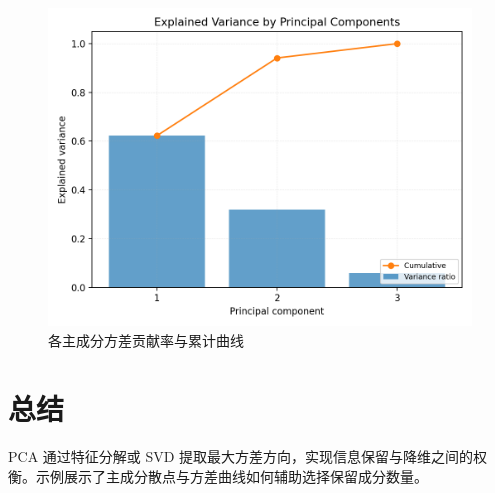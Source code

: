 \documentclass[UTF8,zihao=-4]{ctexart}
\begin{document}
\begin{figure}[H]
  \centering
  \includegraphics[width=0.8\linewidth]{pca_explained_variance.png}
  \caption{各主成分方差贡献率与累计曲线}
  \label{fig:pca_explained_variance_cn}
\end{figure}

\FloatBarrier
\section{总结}
PCA 通过特征分解或 SVD 提取最大方差方向，实现信息保留与降维之间的权衡。示例展示了主成分散点与方差曲线如何辅助选择保留成分数量。
\end{document}

